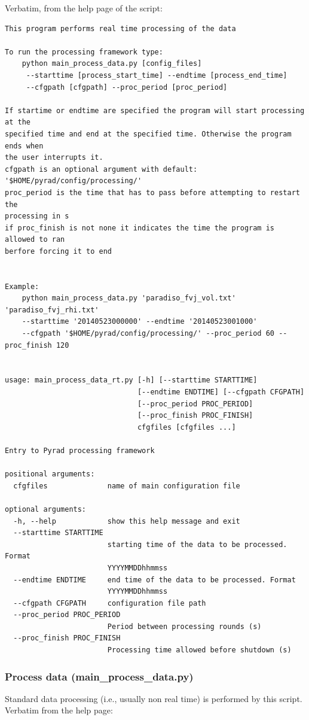 \documentclass[a4paper,11pt,pdftex,twoside]{scrartcl}
\begin{document}
Verbatim, from the help page of the script:
\begin{verbatim}
This program performs real time processing of the data

To run the processing framework type:
    python main_process_data.py [config_files]
     --starttime [process_start_time] --endtime [process_end_time]
     --cfgpath [cfgpath] --proc_period [proc_period]

If startime or endtime are specified the program will start processing at the
specified time and end at the specified time. Otherwise the program ends when
the user interrupts it.
cfgpath is an optional argument with default: '$HOME/pyrad/config/processing/'
proc_period is the time that has to pass before attempting to restart the
processing in s
if proc_finish is not none it indicates the time the program is allowed to ran
berfore forcing it to end


Example:
    python main_process_data.py 'paradiso_fvj_vol.txt' 'paradiso_fvj_rhi.txt'
    --starttime '20140523000000' --endtime '20140523001000'
    --cfgpath '$HOME/pyrad/config/processing/' --proc_period 60 --proc_finish 120


usage: main_process_data_rt.py [-h] [--starttime STARTTIME]
                               [--endtime ENDTIME] [--cfgpath CFGPATH]
                               [--proc_period PROC_PERIOD]
                               [--proc_finish PROC_FINISH]
                               cfgfiles [cfgfiles ...]

Entry to Pyrad processing framework

positional arguments:
  cfgfiles              name of main configuration file

optional arguments:
  -h, --help            show this help message and exit
  --starttime STARTTIME
                        starting time of the data to be processed. Format
                        YYYYMMDDhhmmss
  --endtime ENDTIME     end time of the data to be processed. Format
                        YYYYMMDDhhmmss
  --cfgpath CFGPATH     configuration file path
  --proc_period PROC_PERIOD
                        Period between processing rounds (s)
  --proc_finish PROC_FINISH
                        Processing time allowed before shutdown (s)

\end{verbatim}

\subsubsection{Process data (main\_process\_data.py)}
Standard data processing (i.e., usually non real time) is performed by this script.
Verbatim from the help page:
\end{document}
